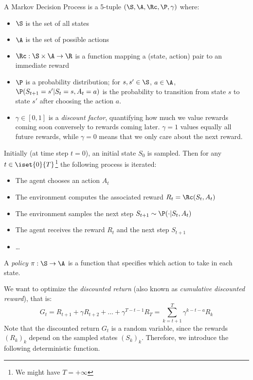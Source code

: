 \begin{definition}
    A Markov Decision Process is a 5-tuple $(\S, \A, \Rc, \P, \gamma)$ where:
    \begin{itemize}
        \item $\S$ is the set of all states
        \item $\A$ is the set of possible actions
        \item $\Rc:\S\times\A\to\R$ is a function mapping a (state, action) pair to an immediate reward
        \item $\P$ is a probability distribution; for $s,s'\in\S$, $a\in\A$, $\P(S_{t+1}=s'|S_t=s,A_t=a)$ is the probability to transition from state $s$ to state $s'$ after choosing the action $a$.
        \item $\gamma\in[0,1]$ is a \emph{discount factor}, quantifying how much we value rewards coming soon conversely to rewards coming later. $\gamma=1$ values equally all future rewards, while $\gamma=0$ means that we only care about the next reward.
    \end{itemize}

    Initially (at time step $t=0$), an initial state $S_0$ is sampled. Then for any $t\in\iset{0}{T}$\footnote{We might have $T=+\infty$} the following process is iterated:
    \begin{itemize}
        \item The agent chooses an action $A_t$
        \item The environment computes the associated reward $R_t=\Rc(S_t,A_t)$
        \item The environment samples the next step $S_{t+1}\sim\P(\cdot|S_t,A_t)$
        \item The agent receives the reward $R_t$ and the next step $S_{t+1}$
        \item \dots
    \end{itemize}
\end{definition}

\begin{definition}[Policy]
    A \emph{policy} $\pi:\S\to\A$ is a function that specifies which action to take in each state.
\end{definition}

We want to optimize the \emph{discounted return} (also known as \emph{cumulative discounted reward}), that is:
\begin{equation*}
    G_t=R_{t+1}+\gamma R_{t+2}+\dots+\gamma^{T-t-1}R_T = \sum_{k=t+1}^T\gamma^{k-t-a}R_k
\end{equation*}
Note that the discounted return $G_t$ is a random variable, since the rewards $(R_k)_k$ depend on the sampled states $(S_k)_k$. 
Therefore, we introduce the following deterministic function.

